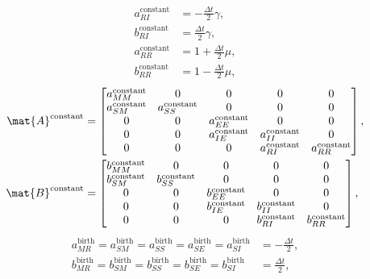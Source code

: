 \documentclass{jpmarticle}
\begin{document}
\begin{equation}
  \begin{split}
    a_{RI}^{\text{constant}} &=
    - \frac{\Delta t}{2} \gamma,
    \\
    b_{RI}^{\text{constant}} &=
    \frac{\Delta t}{2} \gamma,
    \\
    a_{RR}^{\text{constant}} &=
    1 + \frac{\Delta t}{2} \mu,
    \\
    b_{RR}^{\text{constant}} &=
    1 - \frac{\Delta t}{2} \mu,
  \end{split}
\end{equation}
\begin{equation}
  \begin{split}
    \mat{A}^{\text{constant}} &=
    \begin{bmatrix}
      a_{MM}^{\text{constant}} & 0 & 0 & 0 & 0
      \\
      a_{SM}^{\text{constant}} & a_{SS}^{\text{constant}} & 0 & 0 & 0
      \\
      0 & 0 & a_{EE}^{\text{constant}} & 0 & 0
      \\
      0 & 0 & a_{IE}^{\text{constant}} & a_{II}^{\text{constant}} & 0
      \\
      0 & 0 & 0 & a_{RI}^{\text{constant}} & a_{RR}^{\text{constant}}
    \end{bmatrix},
    \\
    \mat{B}^{\text{constant}} &=
    \begin{bmatrix}
      b_{MM}^{\text{constant}} & 0 & 0 & 0 & 0
      \\
      b_{SM}^{\text{constant}} & b_{SS}^{\text{constant}} & 0 & 0 & 0
      \\
      0 & 0 & b_{EE}^{\text{constant}} & 0 & 0 \\
      0 & 0 & b_{IE}^{\text{constant}} & b_{II}^{\text{constant}} & 0
      \\
      0 & 0 & 0 & b_{RI}^{\text{constant}} & b_{RR}^{\text{constant}}
    \end{bmatrix},
  \end{split}
\end{equation}
\begin{equation}
  \begin{split}
    a_{MR}^{\text{birth}} =
    a_{SM}^{\text{birth}} =
    a_{SS}^{\text{birth}} =
    a_{SE}^{\text{birth}} =
    a_{SI}^{\text{birth}} &=
    - \frac{\Delta t}{2},
    \\
    b_{MR}^{\text{birth}} =
    b_{SM}^{\text{birth}} =
    b_{SS}^{\text{birth}} =
    b_{SE}^{\text{birth}} =
    b_{SI}^{\text{birth}} &=
    \frac{\Delta t}{2},
  \end{split}
\end{equation}
\end{document}
